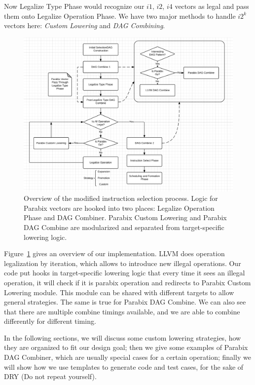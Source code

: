 Now Legalize Type Phase would recognize our $i1$, $i2$, $i4$ vectors as legal and pass them onto Legalize Operation Phase. We have two major methods to handle $i2^k$ vectors here: \textit{Custom Lowering} and \textit{DAG Combining}.

\begin{figure}[ht!]
\centering
\includegraphics[width=140mm]{draw/system.png}
\caption[System overview: modified instruction selection process]{Overview of the modified instruction selection process. Logic for Parabix vectors are hooked into two places: Legalize Operation Phase and DAG Combiner. Parabix Custom Lowering and Parabix DAG Combine are modularized and separated from target-specific lowering logic.}
\label{figure:system}
\end{figure}

Figure~\ref{figure:system} gives an overview of our implementation. LLVM does operation legalization by iteration, which allows to introduce new illegal operations. Our code put hooks in target-specific lowering logic that every time it sees an illegal operation, it will check if it is parabix operation and redirects to Parabix Custom Lowering module. This module can be shared with different targets to allow general strategies. The same is true for Parabix DAG Combine. We can also see that there are multiple combine timings available, and we are able to combine differently for different timing.

In the following sections, we will discuss some custom lowering strategies, how they are organized to fit our design goal; then we give some examples of Parabix DAG Combiner, which are usually special cases for a certain operation; finally we will show how we use templates to generate code and test cases, for the sake of DRY (Do not repeat yourself).

